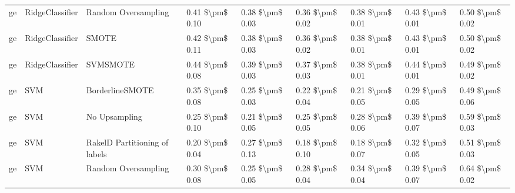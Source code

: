 \begin{tabular}{lllllllll}
      ge &                 RidgeClassifier &           Random Oversampling &     0.41 \$\textbackslash pm\$ 0.10 &           0.38 \$\textbackslash pm\$ 0.03 &       0.36 \$\textbackslash pm\$ 0.02 &        0.38 \$\textbackslash pm\$ 0.01 &                         0.43 \$\textbackslash pm\$ 0.01 &     0.50 \$\textbackslash pm\$ 0.02 \\
      ge &                 RidgeClassifier &                         SMOTE &     0.42 \$\textbackslash pm\$ 0.11 &           0.38 \$\textbackslash pm\$ 0.03 &       0.36 \$\textbackslash pm\$ 0.02 &        0.38 \$\textbackslash pm\$ 0.01 &                         0.43 \$\textbackslash pm\$ 0.01 &     0.50 \$\textbackslash pm\$ 0.02 \\
      ge &                 RidgeClassifier &                      SVMSMOTE &     0.44 \$\textbackslash pm\$ 0.08 &           0.39 \$\textbackslash pm\$ 0.03 &       0.37 \$\textbackslash pm\$ 0.03 &        0.38 \$\textbackslash pm\$ 0.01 &                         0.44 \$\textbackslash pm\$ 0.01 &     0.49 \$\textbackslash pm\$ 0.02 \\
      ge &                             SVM &               BorderlineSMOTE &     0.35 \$\textbackslash pm\$ 0.08 &           0.25 \$\textbackslash pm\$ 0.03 &       0.22 \$\textbackslash pm\$ 0.04 &        0.21 \$\textbackslash pm\$ 0.05 &                         0.29 \$\textbackslash pm\$ 0.05 &     0.49 \$\textbackslash pm\$ 0.06 \\
      ge &                             SVM &                 No Upsampling &     0.25 \$\textbackslash pm\$ 0.10 &           0.21 \$\textbackslash pm\$ 0.05 &       0.25 \$\textbackslash pm\$ 0.05 &        0.28 \$\textbackslash pm\$ 0.06 &                         0.39 \$\textbackslash pm\$ 0.07 &     0.59 \$\textbackslash pm\$ 0.03 \\
      ge &                             SVM & RakelD Partitioning of labels &     0.20 \$\textbackslash pm\$ 0.04 &           0.27 \$\textbackslash pm\$ 0.13 &       0.18 \$\textbackslash pm\$ 0.10 &        0.18 \$\textbackslash pm\$ 0.07 &                         0.32 \$\textbackslash pm\$ 0.05 &     0.51 \$\textbackslash pm\$ 0.03 \\
      ge &                             SVM &           Random Oversampling &     0.30 \$\textbackslash pm\$ 0.08 &           0.25 \$\textbackslash pm\$ 0.05 &       0.28 \$\textbackslash pm\$ 0.04 &        0.34 \$\textbackslash pm\$ 0.04 &                         0.39 \$\textbackslash pm\$ 0.07 &     0.64 \$\textbackslash pm\$ 0.02 \\

\end{tabular}
